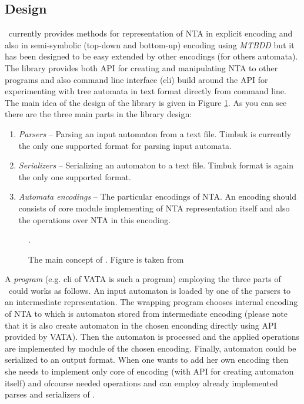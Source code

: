 \subsection{Design}
\vata\ currently provides methods for representation of NTA in explicit encoding and also in semi-symbolic (top-down and bottom-up)
encoding using \emph{MTBDD} but it has been designed to be easy extended by other encodings (for others automata).
The library provides both API for creating and manipulating NTA to other programs and also command line interface (cli) build around
the API for experimenting with tree automata in text format directly from command line.
The main idea of the design of the library is given in Figure \ref{fig:vata}.
As you can see there are the three main parts in the library design:
\begin{enumerate}
	\item \emph{Parsers} -- Parsing an input automaton from a text file.
		Timbuk \cite{timbuk} is currently the only one supported format for parsing input automata.
	\item \emph{Serializers} -- Serializing an automaton to a text file.
		Timbuk format is again the only one supported format.
	\item \emph{Automata encodings} -- The particular encodings of NTA.
		An encoding should consists of core module implementing of NTA representation itself
		and also the operations over NTA in this encoding.
\end{enumerate}

\begin{figure}[bt]
\begin{center}

		\caption{The main concept of \vata. Figure is taken from \cite{tacas12}}.
		\label{fig:vata}
\end{center}
\end{figure}

A \emph{program} (e.g. cli of VATA is such a program) employing the three parts of \vata\ could works as follows.
An input automaton is loaded by one of the parsers to an intermediate representation.
The wrapping program chooses internal encoding of NTA to which is automaton stored from intermediate encoding (please note that it is also
create automaton in the chosen enconding directly using API provided by VATA).
Then the automaton is processed and the applied operations are implemented by module of the chosen encoding.
Finally, automaton could be serialized to an output format.
When one wants to add her own encoding then she needs to implement only core of encoding (with API for creating automaton itself)
and ofcourse needed operations and can employ already implemented parses and serializers of \vata.

